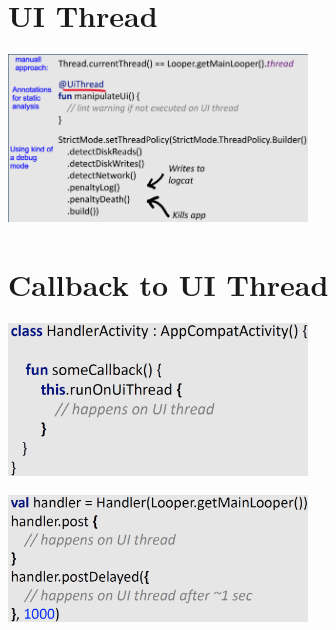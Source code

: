 \documentclass{report}
\newenvironment{Figure}
	{\par\medskip\noindent\minipage{\linewidth}}
	{\endminipage\par\medskip}
\theoremstyle{definition}
\theoremstyle{example}
\begin{document}
\section{UI Thread}
\begin{Figure}
   \centering
    \includegraphics[width=300px]{img/detectingThreadingIssues.png}
        \label{fig:Code Snippet different var for handling UI Threads}
\end{Figure}

\section{Callback to UI Thread}
\begin{Figure}
   \centering
    \includegraphics[width=300px]{img/CallbackUIThreadI.png}
        \label{fig:Code Snippet how to implement a Callback to UI Thread V1}
\end{Figure}
\begin{Figure}
   \centering
    \includegraphics[width=300px]{img/CallbackUIThreadII.png}
        \label{fig:Code Snippet how to implement a Callback to UI Thread V2}
\end{Figure}
\end{document}
